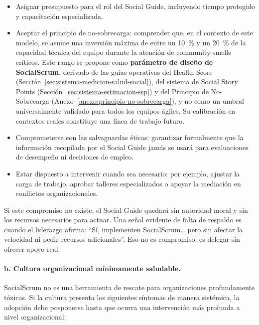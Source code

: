 \begin{itemize}
    \item Asignar presupuesto para el rol del Social Guide, incluyendo tiempo protegido y capacitación especializada.
    \item Aceptar el principio de no-sobrecarga: comprender que, en el contexto de este modelo, se asume una inversión máxima de entre un 10~\% y un 20~\% de la capacidad técnica del equipo durante la atención de \gls{community-smells} críticos. Este rango se propone como \textbf{parámetro de diseño de SocialScrum}, derivado de las guías operativas del Health Score (Sección~\ref{sec:sistema-medicion-salud-social}), del sistema de Social Story Points (Sección~\ref{sec:sistema-estimacion-ssp}) y del Principio de No-Sobrecarga (Anexo~\ref{anexo:principio-no-sobrecarga}), y no como un umbral universalmente validado para todos los equipos ágiles. Su calibración en contextos reales constituye una línea de trabajo futuro.
    \item Comprometerse con las salvaguardas éticas: garantizar formalmente que la información recopilada por el Social Guide jamás se usará para evaluaciones de desempeño ni decisiones de empleo.
    \item Estar dispuesto a intervenir cuando sea necesario: por ejemplo, ajustar la carga de trabajo, aprobar talleres especializados o apoyar la mediación en conflictos organizacionales.
\end{itemize}

Si este compromiso no existe, el Social Guide quedará sin autoridad moral y sin los recursos necesarios para actuar. Una señal evidente de falta de respaldo es cuando el liderazgo afirma: ``Sí, implementen SocialScrum… pero sin afectar la velocidad ni pedir recursos adicionales''. Eso no es compromiso; es delegar sin ofrecer apoyo real.

\paragraph{b. Cultura organizacional mínimamente saludable.}

SocialScrum no es una herramienta de rescate para organizaciones profundamente tóxicas. Si la cultura presenta los siguientes síntomas de manera sistémica, la adopción debe posponerse hasta que ocurra una intervención más profunda a nivel organizacional:

